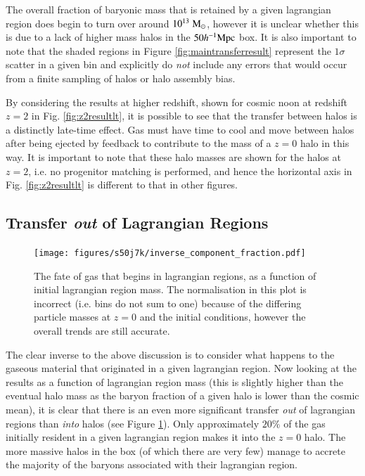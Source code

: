 The overall fraction of baryonic mass that is retained by a given lagrangian
region does begin to turn over around $10^{13} \;{\rm M}_{\odot}{}$, however it is unclear
whether this is due to a lack of higher mass halos in the $50 h^{-1}{\rm Mpc}{}$ box. It
is also important to note that the shaded regions in Figure
\ref{fig:maintransferresult} represent the $1\sigma$ scatter in a given bin
and explicitly do \emph{not} include any errors that would occur from a finite
sampling of halos or halo assembly bias.


By considering the results at higher redshift, shown for cosmic noon at redshift
$z=2$ in Fig. \ref{fig:z2resultlt}, it is possible to see that the transfer
between halos is a distinctly late-time effect. Gas must have time to cool and
move between halos after being ejected by feedback to contribute to the mass
of a $z=0$ halo in this way. It is important to note that these halo masses are
shown for the halos at $z=2$, i.e. no progenitor matching is performed, and hence
the horizontal axis in Fig. \ref{fig:z2resultlt} is different to that in other
figures.

\subsection{Transfer \emph{out} of Lagrangian Regions}

\begin{figure}
	\centering
	\texttt{[image: figures/s50j7k/inverse\_component\_fraction.pdf]}
	\vspace{-0.7cm}
	\caption{The fate of gas that begins in lagrangian regions, as a function of
	initial lagrangian region mass. The normalisation in this plot is incorrect
	(i.e. bins do not sum to one) because of the differing particle masses at 
	$z=0$ and the initial conditions, however the overall trends are still 
	accurate.  }
	\label{fig:transferoutoflrs}
\end{figure}

The clear inverse to the above discussion is to consider what happens to the gaseous
material that originated in a given lagrangian region. Now looking at the results as
a function of lagrangian region mass (this is slightly higher than the eventual
halo mass as the baryon fraction of a given halo is lower than the cosmic mean), it
is clear that there is an even more significant transfer \emph{out} of lagrangian
regions than \emph{into} halos (see Figure \ref{fig:transferoutoflrs}). Only 
approximately $20\%$ of the gas initially resident in a given lagrangian region
makes it into the $z=0$ halo. The more massive halos in the box (of which there 
are very few) manage to accrete the majority of the baryons associated with their
lagrangian region.

